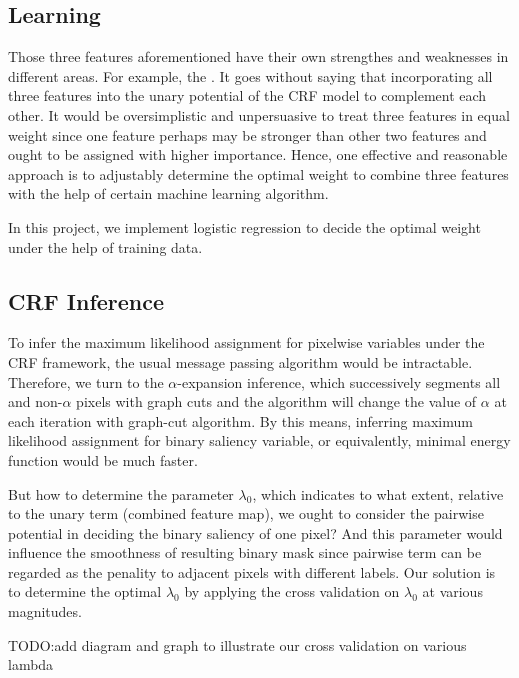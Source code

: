 \documentclass[10pt,twocolumn,letterpaper]{article}
\begin{document}
\subsection{Learning}
Those three features aforementioned have their own strengthes and weaknesses in different areas. For example, the .
It goes without saying that incorporating all three features into the unary potential of the CRF model 
to complement each other. It would be oversimplistic and unpersuasive to treat three features in equal weight 
since one feature perhaps may be stronger than other two features and ought to be assigned with higher importance.
Hence, one effective and reasonable approach is to adjustably determine the optimal weight to combine three features
with the help of certain machine learning algorithm. 

In this project, we implement logistic regression to decide the optimal weight under the help of training data.

\subsection{CRF Inference}
To infer the maximum likelihood assignment for pixelwise variables under the CRF framework,
the usual message passing algorithm would be intractable. Therefore, we turn to the $\alpha$-expansion inference,
which successively segments all and non-$\alpha$ pixels with graph cuts and the algorithm will 
change the value of $\alpha$ at each iteration with graph-cut algorithm. 
By this means, inferring maximum likelihood assignment for binary saliency variable, or equivalently, 
 minimal energy function would be much faster. 

But how to determine the parameter $\lambda_0$, which indicates to what extent, relative to the 
unary term (combined feature map), we ought to consider the pairwise potential in 
deciding the binary saliency of one pixel? And this parameter would influence the smoothness of
resulting binary mask since pairwise term can be regarded as the penality to adjacent pixels 
with different labels. Our solution is to determine the optimal $\lambda_0$
by applying the cross validation on $\lambda_0$ at various magnitudes. 

TODO:add diagram and graph to illustrate our cross validation on various lambda \\
\end{document}
